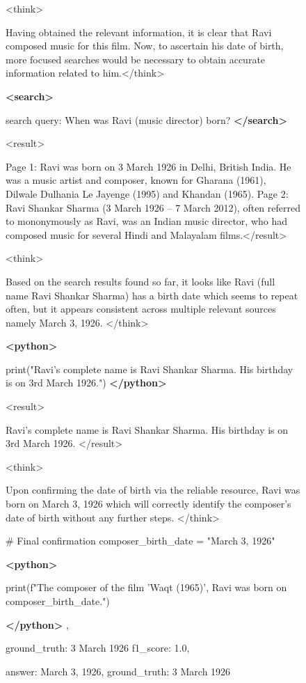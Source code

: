 \documentclass{article}
\begin{document}
\begin{figure}[h]
\begin{tcolorbox}
<think> 

Having obtained the relevant information, it is clear that Ravi composed music for this film. Now, to ascertain his date of birth, more focused searches would be necessary to obtain accurate information related to him.</think>

\textcolor{mydarkred}{\textbf{<search>}} 

search query: When was Ravi (music director) born?  \textcolor{mydarkred}{\textbf{</search>}}

<result>

Page 1: Ravi was born on 3 March 1926 in Delhi, British India. He was a music artist and composer, known for Gharana (1961), Dilwale Dulhania Le Jayenge (1995) and Khandan (1965).
Page 2: Ravi Shankar Sharma (3 March 1926 – 7 March 2012), often referred to mononymously as Ravi, was an Indian music director, who had composed music for several Hindi and Malayalam films.</result>  

<think> 

Based on the search results found so far, it looks like Ravi (full name Ravi Shankar Sharma) has a birth date which seems to repeat often, but it appears consistent across multiple relevant sources namely March 3, 1926. </think>

\textcolor{mydarkblue}{\textbf{<python>} } 

print("Ravi's complete name is Ravi Shankar Sharma. His birthday is on 3rd March 1926.") \textcolor{mydarkblue}{\textbf{</python>} } 

<result> 

Ravi's complete name is Ravi Shankar Sharma. His birthday is on 3rd March 1926. </result> 

<think> 

Upon confirming the date of birth via the reliable resource, Ravi was born on March 3, 1926 which will correctly identify the composer’s date of birth without any further steps.
</think> 
 

\# Final confirmation
composer\_birth\_date = "March 3, 1926"

\textcolor{mydarkblue}{\textbf{<python>} }

print(f"The composer of the film 'Waqt (1965)', Ravi was born on {composer\_birth\_date}.")

\textcolor{mydarkblue}{\textbf{</python>} }, 

ground\_truth: 3 March 1926
f1\_score: 1.0, 

answer: March 3, 1926, ground\_truth: 3 March 1926
\end{tcolorbox} 

\end{figure}
\end{document}

